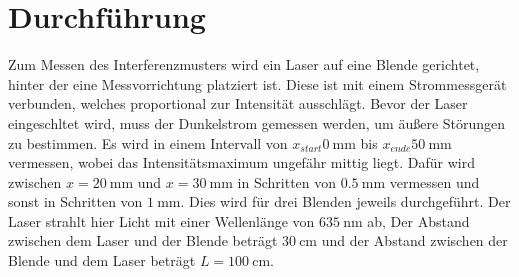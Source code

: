 \section{Durchführung}
Zum Messen des Interferenzmusters wird ein Laser auf eine Blende gerichtet, hinter der
eine Messvorrichtung platziert ist. Diese ist mit einem Strommessgerät verbunden, welches proportional zur Intensität
ausschlägt. Bevor der Laser eingeschltet wird, muss der Dunkelstrom gemessen werden, um äußere Störungen zu bestimmen.
Es wird in einem Intervall von $x_{start}\qty{0}{\milli\meter}$ bis $x_{ende}\qty{50}{\milli\meter}$ vermessen, wobei das 
Intensitätsmaximum ungefähr mittig liegt. Dafür wird zwischen $x=\qty{20}{\milli\meter}$ und $x=\qty{30}{\milli\meter}$ in
Schritten von $\qty{0.5}{\milli\meter}$ vermessen und sonst in Schritten von $\qty{1}{\milli\meter}$. Dies wird für 
drei Blenden jeweils durchgeführt. Der Laser strahlt hier Licht mit einer Wellenlänge von $\qty{635}{\nano\meter}$ ab, 
Der Abstand zwischen dem Laser und der Blende beträgt $\qty{30}{\centi\meter}$ und der Abstand zwischen der Blende und dem
Laser beträgt $L=\qty{100}{\centi\meter}$.
\label{sec:Durchführung}
